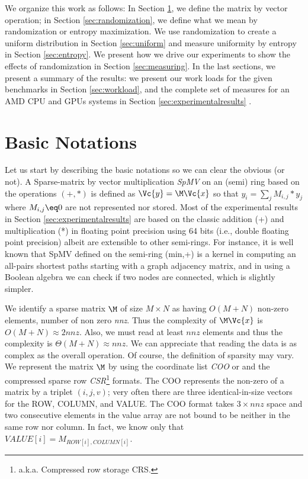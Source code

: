 \documentclass[manuscript,screen]{acmart}
\begin{document}
We organize this work as follows: In Section \ref{sec:notations}, we
define the matrix by vector operation; in Section
\ref{sec:randomization}, we define what we mean by randomization or
entropy maximization. We use randomization to create a uniform
distribution in Section \ref{sec:uniform} and measure uniformity
by entropy in Section \ref{sec:entropy}. We present how we drive our
experiments to show the effects of randomization in Section
\ref{sec:measuring}. In the last sections, we present a summary of the
results: we present our work loads for the given benchmarks in Section
\ref{sec:workload}, and the complete set of measures for an AMD CPU
and GPUs systems in Section \ref{sec:experimentalresults} .

\section{Basic Notations}
\label{sec:notations}
Let us start by describing the basic notations so we can clear the
obvious (or not).  A Sparse-matrix by vector multiplication {\em SpMV}
on an (semi) ring based on the operations $(+,*)$ is defined as
$\Vc{y} = \M \Vc{x}$ so that $y_i = \sum_j M_{i,j}*y_j$ where $M_{i,j}
\eq 0$ are not represented nor stored. Most of the experimental
results in Section \ref{sec:experimentalresults} are based on the
classic addition (+) and multiplication (*) in floating point
precision using 64 bits (i.e., double floating point precision) albeit
are extensible to other semi-rings.  For instance, it is well known
that SpMV defined on the semi-ring (min,+) is a kernel in computing an
all-pairs shortest paths starting with a graph adjacency matrix, and
in using a Boolean algebra we can check if two nodes are connected,
which is slightly simpler.

We identify a sparse matrix $\M$ of size $M\times N$ as having
$O(M+N)$ non-zero elements, number of non zero {\em nnz}. Thus the
complexity of $\M \Vc{x}$ is $O(M+N) \approx 2nnz$. Also, we must read
at least $nnz$ elements and thus the complexity is $\Theta(M+N)
\approx nnz$. We can appreciate that reading the data is as complex as
the overall operation. Of course, the definition of sparsity may
vary. We represent the matrix $\M$ by using the coordinate list {\em
  COO} or and the compressed sparse row {\em
  CSR}\footnote{a.k.a. Compressed row storage {\rm CRS}.}
formats. The COO represents the non-zero of a matrix by a triplet
$(i,j,v)$; very often there are three identical-in-size vectors for
the ROW, COLUMN, and VALUE. The COO format takes $3\times nnz$ space
and two consecutive elements in the value array are not bound to be
neither in the same row nor column. In fact, we know only that
$VALUE[i] = M_{ROW[i],COLUMN[i]}$.
\end{document}
